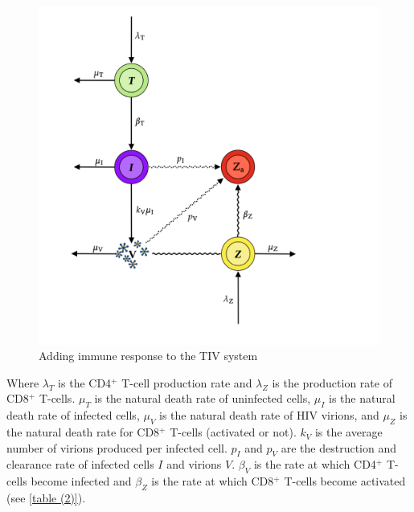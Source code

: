 \documentclass[letterpaper, 11 pt, conference]{ieeeconf}
\begin{document}
\begin{figure}[thpb]
      \centering
      \includegraphics[scale = .2]{Images/TIVZZa.png}
      \caption{Adding immune response to the TIV system}
      \label{fig:2}
\end{figure}

Where $\lambda_{T}$ is the CD4$^{+}$ T-cell production rate and $\lambda_{Z}$ is the production rate of CD8$^{+}$ T-cells. $\mu_{T}$ is the natural death rate of uninfected cells, $\mu_{I}$ is the natural death rate of infected cells, $\mu_{V}$ is the natural death rate of HIV virions, and $\mu_Z$ is the natural death rate for CD8$^{+}$ T-cells (activated or not). $k_{V}$ is the average number of virions produced per infected cell. $p_{I}$ and $p_{V}$ are the destruction and clearance rate of infected cells $I$ and virions $V$. $\beta_{V}$ is the rate at which CD4$^{+}$ T-cells become infected and $\beta_{Z}$ is the rate at which CD8$^{+}$ T-cells become activated (see \ref{table (2)}). 
\end{document}
